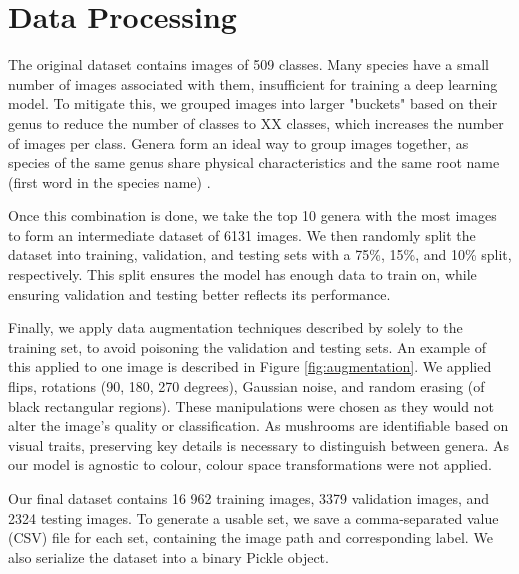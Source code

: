 \documentclass{article} %
\begin{document}
\section{Data Processing}
\label{sec:data_processing}
The original dataset contains images of 509 classes. Many species have a small number of images associated with them, insufficient for training a deep learning model. To mitigate this, we grouped images into larger "buckets" based on their genus to reduce the number of classes to XX classes, which increases the number of images per class. Genera form an ideal way to group images together, as species of the same genus share physical characteristics and the same root name (first word in the species name) \citep{HollisterCaiEtAl.UsingComputerVision.2023}.

Once this combination is done, we take the top 10 genera with the most images to form an intermediate dataset of 6131 images. We then randomly split the dataset into training, validation, and testing sets with a 75\%, 15\%, and 10\% split, respectively. This split ensures the model has enough data to train on, while ensuring validation and testing better reflects its performance.

Finally, we apply data augmentation techniques described by \cite{ShortenKhoshgoftaar.SurveyImageData.2019} solely to the training set, to avoid poisoning the validation and testing sets. An example of this applied to one image is described in Figure \ref{fig:augmentation}. We applied flips, rotations (90, 180, 270 degrees), Gaussian noise, and random erasing (of black rectangular regions). These manipulations were chosen as they would not alter the image's quality or classification. As mushrooms are identifiable based on visual traits, preserving key details is necessary to distinguish between genera. As our model is agnostic to colour, colour space transformations were not applied.

Our final dataset contains 16 962 training images, 3379 validation images, and 2324 testing images. To generate a usable set, we save a comma-separated value (CSV) file for each set, containing the image path and corresponding label. We also serialize the dataset into a binary Pickle object.
\end{document}

